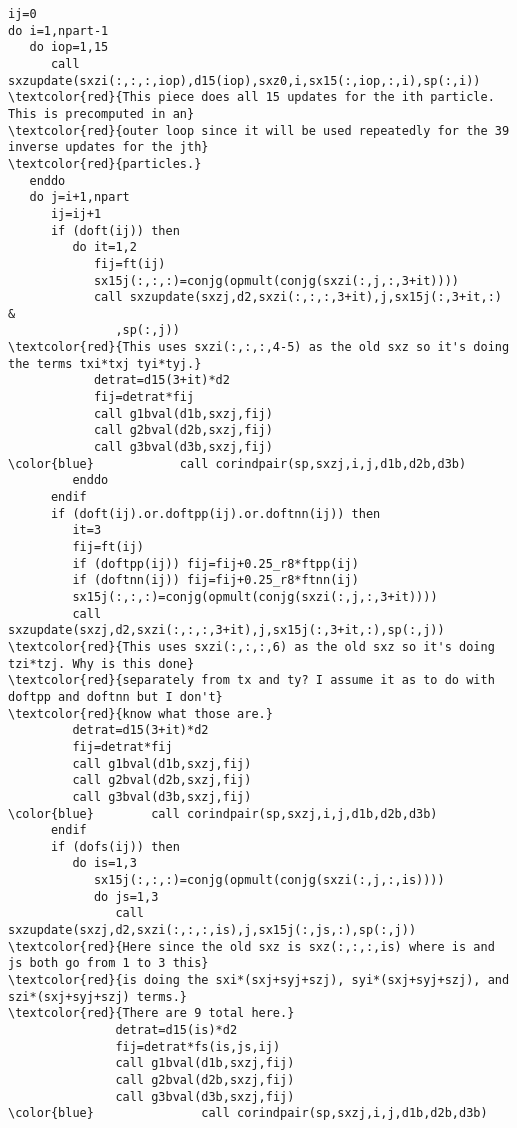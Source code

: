\documentclass[12pt]{extarticle}
\begin{document}
\begin{Verbatim}[commandchars=\\\{\}]
ij=0
do i=1,npart-1
   do iop=1,15
      call sxzupdate(sxzi(:,:,:,iop),d15(iop),sxz0,i,sx15(:,iop,:,i),sp(:,i))
\textcolor{red}{This piece does all 15 updates for the ith particle. This is precomputed in an}
\textcolor{red}{outer loop since it will be used repeatedly for the 39 inverse updates for the jth}
\textcolor{red}{particles.}
   enddo
   do j=i+1,npart
      ij=ij+1
      if (doft(ij)) then
         do it=1,2
            fij=ft(ij)
            sx15j(:,:,:)=conjg(opmult(conjg(sxzi(:,j,:,3+it))))
            call sxzupdate(sxzj,d2,sxzi(:,:,:,3+it),j,sx15j(:,3+it,:) &
               ,sp(:,j))
\textcolor{red}{This uses sxzi(:,:,:,4-5) as the old sxz so it's doing the terms txi*txj tyi*tyj.}
            detrat=d15(3+it)*d2
            fij=detrat*fij
            call g1bval(d1b,sxzj,fij)
            call g2bval(d2b,sxzj,fij)
            call g3bval(d3b,sxzj,fij)
\color{blue}            call corindpair(sp,sxzj,i,j,d1b,d2b,d3b)
         enddo
      endif
      if (doft(ij).or.doftpp(ij).or.doftnn(ij)) then
         it=3
         fij=ft(ij)
         if (doftpp(ij)) fij=fij+0.25_r8*ftpp(ij)
         if (doftnn(ij)) fij=fij+0.25_r8*ftnn(ij)
         sx15j(:,:,:)=conjg(opmult(conjg(sxzi(:,j,:,3+it))))
         call sxzupdate(sxzj,d2,sxzi(:,:,:,3+it),j,sx15j(:,3+it,:),sp(:,j))
\textcolor{red}{This uses sxzi(:,:,:,6) as the old sxz so it's doing tzi*tzj. Why is this done}
\textcolor{red}{separately from tx and ty? I assume it as to do with doftpp and doftnn but I don't}
\textcolor{red}{know what those are.}
         detrat=d15(3+it)*d2
         fij=detrat*fij
         call g1bval(d1b,sxzj,fij)
         call g2bval(d2b,sxzj,fij)
         call g3bval(d3b,sxzj,fij)
\color{blue}        call corindpair(sp,sxzj,i,j,d1b,d2b,d3b)
      endif
      if (dofs(ij)) then
         do is=1,3
            sx15j(:,:,:)=conjg(opmult(conjg(sxzi(:,j,:,is))))
            do js=1,3
               call sxzupdate(sxzj,d2,sxzi(:,:,:,is),j,sx15j(:,js,:),sp(:,j))
\textcolor{red}{Here since the old sxz is sxz(:,:,:,is) where is and js both go from 1 to 3 this}
\textcolor{red}{is doing the sxi*(sxj+syj+szj), syi*(sxj+syj+szj), and szi*(sxj+syj+szj) terms.}
\textcolor{red}{There are 9 total here.}
               detrat=d15(is)*d2
               fij=detrat*fs(is,js,ij)
               call g1bval(d1b,sxzj,fij)
               call g2bval(d2b,sxzj,fij)
               call g3bval(d3b,sxzj,fij)
\color{blue}               call corindpair(sp,sxzj,i,j,d1b,d2b,d3b)

\end{Verbatim}
\end{document}
